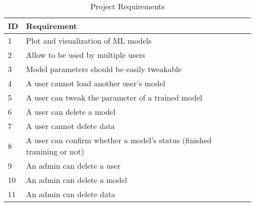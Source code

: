 \documentclass[11pt]{article}
\begin{document}
\begin{table}[htb]
 \small
 \centering
  \begin{tabular}{|l|l|l|l|}
  \hline
  \bf ID & \bf Requirement                                                           \\ \hline
       1 & Plot and visualization of ML models                                       \\
       2 & Allow to be used by multiple users                                        \\
       3 & Model parameters should be easily tweakable                               \\
       4 & A user cannot load another user's model                                   \\
       5 & A user can tweak the parameter of a trained model                         \\
       6 & A user can delete a model                                                 \\
       7 & A user cannot delete data                                                 \\
       8 & A user can confirm whether a model's status (finished tranining or not)   \\
       9 & An admin can delete a user                                                \\
      10 & An admin can delete a model                                               \\
      11 & An admin can delete data                                                  \\
  \hline
  \end{tabular}
 \caption{Project Requirements} 
\end{table}
\end{document}
